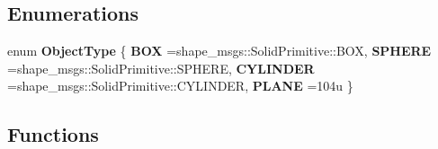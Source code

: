 \subsection*{Enumerations}
\begin{DoxyCompactItemize}
\item 
\mbox{\label{namespace_r_n_b_1_1_moveit_compact_a30e71dcacf927103e0bf218000be6569}} 
enum {\bfseries Object\+Type} \{ {\bfseries B\+OX} =shape\+\_\+msgs\+:\+:Solid\+Primitive\+:\+:B\+OX, 
{\bfseries S\+P\+H\+E\+RE} =shape\+\_\+msgs\+:\+:Solid\+Primitive\+:\+:S\+P\+H\+E\+RE, 
{\bfseries C\+Y\+L\+I\+N\+D\+ER} =shape\+\_\+msgs\+:\+:Solid\+Primitive\+:\+:C\+Y\+L\+I\+N\+D\+ER, 
{\bfseries P\+L\+A\+NE} =104u
 \}
\end{DoxyCompactItemize}
\subsection*{Functions}
